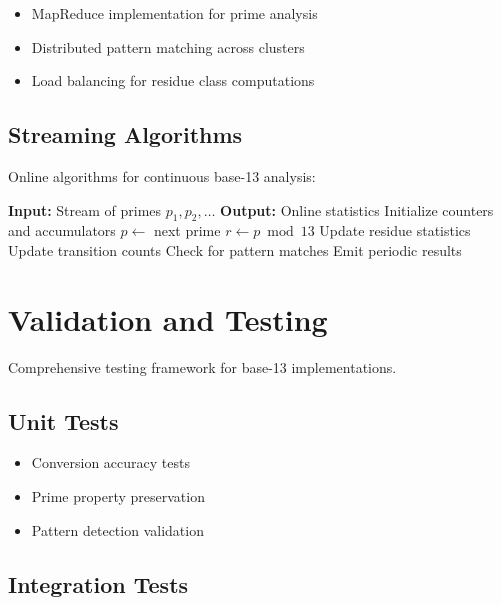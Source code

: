 \documentclass[12pt,a4paper]{report}
\begin{document}
\begin{itemize}
\item MapReduce implementation for prime analysis
\item Distributed pattern matching across clusters
\item Load balancing for residue class computations
\end{itemize}

\subsection{Streaming Algorithms}

Online algorithms for continuous base-13 analysis:

\begin{algorithm}[H]
\caption{Streaming Base-13 Analysis}
\begin{algorithmic}[1]
\STATE \textbf{Input:} Stream of primes $p_1, p_2, \ldots$
\STATE \textbf{Output:} Online statistics
\STATE Initialize counters and accumulators
    \STATE $p \leftarrow$ next prime
    \STATE $r \leftarrow p \bmod 13$
    \STATE Update residue statistics
    \STATE Update transition counts
    \STATE Check for pattern matches
    \STATE Emit periodic results
\ENDWHILE
\end{algorithmic}
\end{algorithm}

\section{Validation and Testing}

Comprehensive testing framework for base-13 implementations.

\subsection{Unit Tests}

\begin{itemize}
\item Conversion accuracy tests
\item Prime property preservation
\item Pattern detection validation
\end{itemize}

\subsection{Integration Tests}
\end{document}
